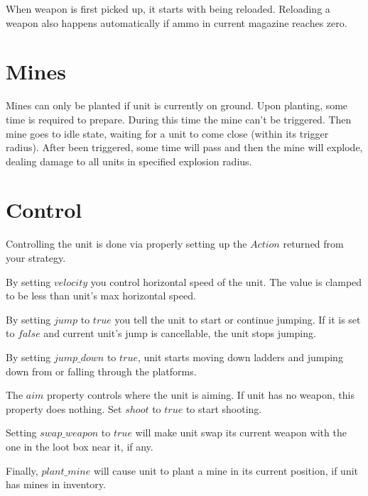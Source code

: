 When weapon is first picked up, it starts with being reloaded.
Reloading a weapon also happens automatically if ammo in current magazine reaches zero.

\section{Mines}

Mines can only be planted if unit is currently on ground.
Upon planting, some time is required to prepare. During this time the mine can't be triggered.
Then mine goes to idle state, waiting for a unit to come close (within its trigger radius).
After been triggered, some time will pass and then the mine will explode, dealing damage to all units in specified explosion radius.

\section{Control}

Controlling the unit is done via properly setting up the $Action$ returned from your strategy.

By setting $velocity$ you control horizontal speed of the unit. The value is clamped to be less than unit's max horizontal speed.

By setting $jump$ to $true$ you tell the unit to start or continue jumping.
If it is set to $false$ and current unit's jump is cancellable, the unit stops jumping.

By setting $jump\_down$ to $true$, unit starts moving down ladders and jumping down from or falling through the platforms.

The $aim$ property controls where the unit is aiming. If unit has no weapon, this property does nothing.
Set $shoot$ to $true$ to start shooting.

Setting $swap\_weapon$ to $true$ will make unit swap its current weapon with the one in the loot box near it, if any.

Finally, $plant\_mine$ will cause unit to plant a mine in its current position, if unit has mines in inventory.